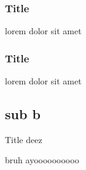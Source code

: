 \documentclass{beamer}
\begin{document}
\begin{frame}
    \frametitle{Title}
    lorem dolor sit amet
\end{frame}

\begin{frame}
    \frametitle{Title}
    lorem dolor sit amet
\end{frame}

\subsection{sub b}

\begin{frame}{Title deez}

\end{frame}

\begin{frame}{b}{ruh}
    ayoooooooooo

\end{frame}
\end{document}
